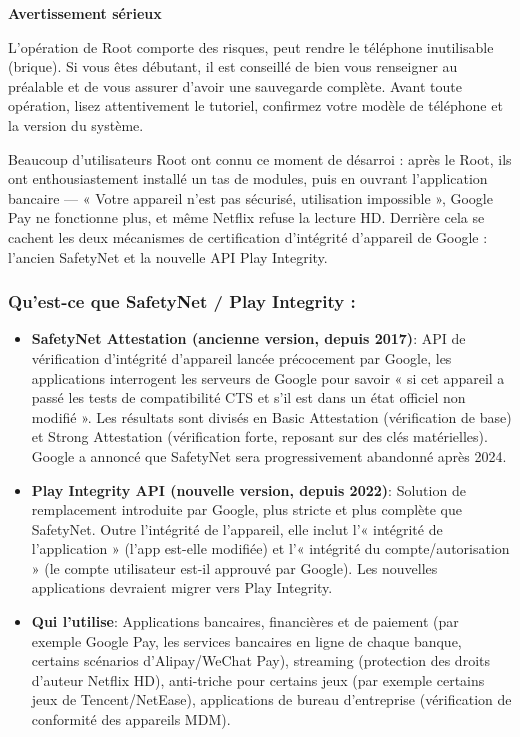\textbf{Avertissement sérieux}\par

L'opération de Root comporte des risques, peut rendre le téléphone inutilisable (brique). Si vous êtes débutant, il est conseillé de bien vous renseigner au préalable et de vous assurer d'avoir une sauvegarde complète. Avant toute opération, lisez attentivement le tutoriel, confirmez votre modèle de téléphone et la version du système.


Beaucoup d'utilisateurs Root ont connu ce moment de désarroi : après le Root, ils ont enthousiastement installé un tas de modules, puis en ouvrant l'application bancaire — « Votre appareil n'est pas sécurisé, utilisation impossible », Google Pay ne fonctionne plus, et même Netflix refuse la lecture HD. Derrière cela se cachent les deux mécanismes de certification d'intégrité d'appareil de Google : l'ancien SafetyNet et la nouvelle API Play Integrity.

\subsubsection*{Qu'est-ce que SafetyNet / Play Integrity :}

\begin{itemize}
  \item \textbf{SafetyNet Attestation (ancienne version, depuis 2017)}: API de vérification d'intégrité d'appareil lancée précocement par Google, les applications interrogent les serveurs de Google pour savoir « si cet appareil a passé les tests de compatibilité CTS et s'il est dans un état officiel non modifié ». Les résultats sont divisés en Basic Attestation (vérification de base) et Strong Attestation (vérification forte, reposant sur des clés matérielles). Google a annoncé que SafetyNet sera progressivement abandonné après 2024.
  \item \textbf{Play Integrity API (nouvelle version, depuis 2022)}: Solution de remplacement introduite par Google, plus stricte et plus complète que SafetyNet. Outre l'intégrité de l'appareil, elle inclut l'« intégrité de l'application » (l'app est-elle modifiée) et l'« intégrité du compte/autorisation » (le compte utilisateur est-il approuvé par Google). Les nouvelles applications devraient migrer vers Play Integrity.
  \item \textbf{Qui l'utilise}: Applications bancaires, financières et de paiement (par exemple Google Pay, les services bancaires en ligne de chaque banque, certains scénarios d'Alipay/WeChat Pay), streaming (protection des droits d'auteur Netflix HD), anti-triche pour certains jeux (par exemple certains jeux de Tencent/NetEase), applications de bureau d'entreprise (vérification de conformité des appareils MDM).
\end{itemize}

